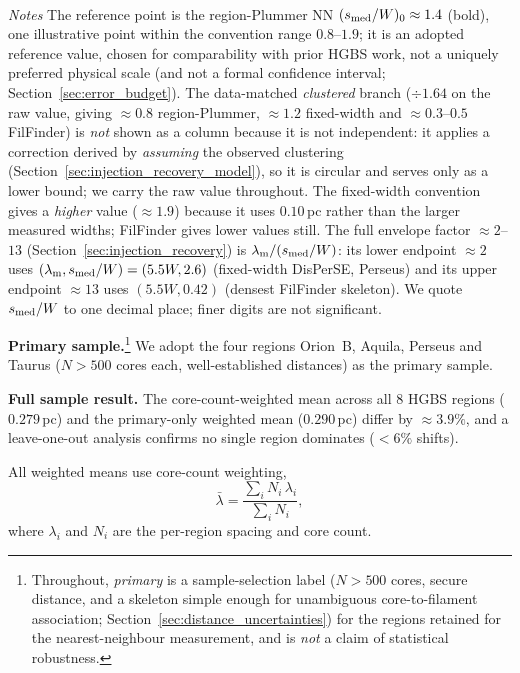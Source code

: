\documentclass[usenatbib,twoside,twocolumn]{mnras}
\begin{document}
\begin{table}
\begin{tabular}{p{4.2cm}cc}
\end{tabular}
\\[2pt]
\footnotesize
\emph{Notes} The reference point is the region-Plummer NN $(s_{\rm med}/W)_0\approx1.4$ (bold), one illustrative point within the convention range $0.8$--$1.9$; it is an adopted reference value, chosen for comparability with prior HGBS work, not a uniquely preferred physical scale (and not a formal confidence interval; Section~\ref{sec:error_budget}). The data-matched \emph{clustered} branch ($\div1.64$ on the raw value, giving $\approx0.8$ region-Plummer, $\approx1.2$ fixed-width and $\approx0.3$--$0.5$ FilFinder) is \emph{not} shown as a column because it is not independent: it applies a correction derived by \emph{assuming} the observed clustering (Section~\ref{sec:injection_recovery_model}), so it is circular and serves only as a lower bound; we carry the raw value throughout. The fixed-width convention gives a \emph{higher} value ($\approx1.9$) because it uses $0.10$\,pc rather than the larger measured widths; FilFinder gives lower values still. The full envelope factor $\approx2$--$13$ (Section~\ref{sec:injection_recovery}) is $\lambda_{\rm m}/(s_{\rm med}/W)$: its lower endpoint $\approx2$ uses $(\lambda_{\rm m},s_{\rm med}/W)=(5.5W,2.6)$ (fixed-width DisPerSE, Perseus) and its upper endpoint $\approx13$ uses $(5.5W,0.42)$ (densest FilFinder skeleton). We quote $s_{\rm med}/W$ to one decimal place; finer digits are not significant.
\end{table}

\textbf{Primary sample.}\footnote{Throughout, \emph{primary} is a sample-selection label ($N>500$ cores, secure distance, and a skeleton simple enough for unambiguous core-to-filament association; Section~\ref{sec:distance_uncertainties}) for the regions retained for the nearest-neighbour measurement, and is \emph{not} a claim of statistical robustness.} We adopt the four regions Orion~B, Aquila, Perseus and Taurus ($N>500$ cores each, well-established distances) as the primary sample.

\textbf{Full sample result.} The core-count-weighted mean across all 8 HGBS regions ($0.279$\,pc) and the primary-only weighted mean ($0.290$\,pc) differ by $\approx3.9\%$, and a leave-one-out analysis confirms no single region dominates ($<6\%$ shifts).

All weighted means use core-count weighting,
\begin{equation}
\bar{\lambda} = \frac{\sum_i N_i\,\lambda_i}{\sum_i N_i},
\label{eq:weighting}
\end{equation}
where $\lambda_i$ and $N_i$ are the per-region spacing and core count.
\end{document}
